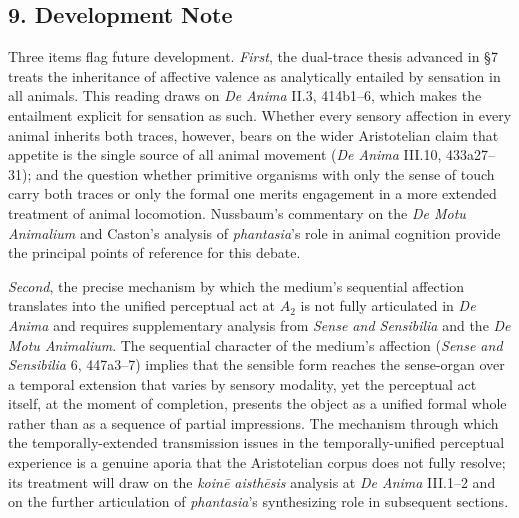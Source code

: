 \documentclass[12pt]{article}
\begin{document}
\subsection*{9. Development Note}

Three items flag future development. \textit{First}, the dual-trace thesis advanced in §7 treats the inheritance of affective valence as analytically entailed by sensation in all animals. This reading draws on \textit{De Anima} II.3, 414b1--6, which makes the entailment explicit for sensation as such. Whether every sensory affection in every animal inherits both traces, however, bears on the wider Aristotelian claim that appetite is the single source of all animal movement (\textit{De Anima} III.10, 433a27--31); and the question whether primitive organisms with only the sense of touch carry both traces or only the formal one merits engagement in a more extended treatment of animal locomotion. Nussbaum's commentary on the \textit{De Motu Animalium} and Caston's analysis of \textit{phantasia}'s role in animal cognition provide the principal points of reference for this debate.

\textit{Second}, the precise mechanism by which the medium's sequential affection translates into the unified perceptual act at $A_2$ is not fully articulated in \textit{De Anima} and requires supplementary analysis from \textit{Sense and Sensibilia} and the \textit{De Motu Animalium}. The sequential character of the medium's affection (\textit{Sense and Sensibilia} 6, 447a3--7) implies that the sensible form reaches the sense-organ over a temporal extension that varies by sensory modality, yet the perceptual act itself, at the moment of completion, presents the object as a unified formal whole rather than as a sequence of partial impressions. The mechanism through which the temporally-extended transmission issues in the temporally-unified perceptual experience is a genuine aporia that the Aristotelian corpus does not fully resolve; its treatment will draw on the \textit{koinē aisthēsis} analysis at \textit{De Anima} III.1--2 and on the further articulation of \textit{phantasia}'s synthesizing role in subsequent sections.
\end{document}

